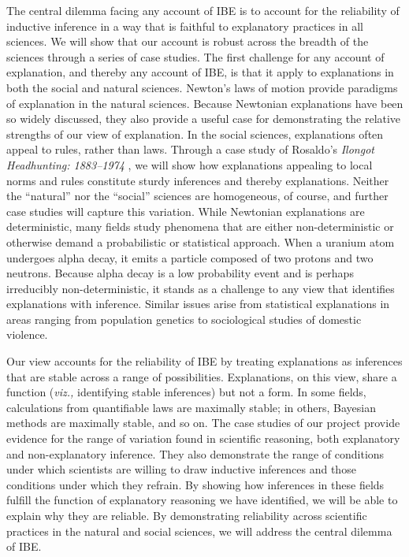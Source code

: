 \documentclass{article}[11pt]
\begin{document}
The central dilemma facing any account of IBE is to account for the reliability of inductive inference in a way that is faithful to explanatory practices in all sciences.  We will show that our account is robust across the breadth of the sciences through a series of case studies. The first challenge for any account of explanation, and thereby any account of IBE, is that it apply to explanations in both the social and natural sciences.  Newton's laws of motion provide paradigms of explanation in the natural sciences.  Because Newtonian explanations have been so widely discussed, they also provide a useful case for demonstrating the relative strengths of our view of explanation.  In the social sciences, explanations often appeal to rules, rather than laws. Through a case study of Rosaldo's \textit{Ilongot Headhunting: 1883--1974} \parencite*{Rosaldo1980}, we will show how explanations appealing to local norms and rules constitute sturdy inferences and thereby explanations.  Neither the ``natural'' nor the ``social'' sciences are homogeneous, of course, and further case studies will capture this variation.  While Newtonian explanations are deterministic, many fields study phenomena that are either non-deterministic or otherwise demand a probabilistic or statistical approach.  When a uranium atom undergoes alpha decay, it emits a particle composed of two protons and two neutrons.  Because alpha decay is a low probability event and is perhaps irreducibly non-deterministic, it stands as a challenge to any view that identifies explanations with inference.  Similar issues arise from statistical explanations in areas ranging from population genetics to sociological studies of domestic violence.  

Our view accounts for the reliability of IBE by treating explanations as inferences that are stable across a range of possibilities.  Explanations, on this view, share a function (\textit{viz.,} identifying stable inferences) but not a form.  In some fields, calculations from quantifiable laws are maximally stable; in others, Bayesian methods are maximally stable, and so on.  The case studies of our project provide evidence for the range of variation found in scientific reasoning, both explanatory and non-explanatory inference.  They also demonstrate the range of conditions under which scientists are willing to draw inductive inferences and those conditions under which they refrain.  By showing how inferences in these fields fulfill the function of explanatory reasoning we have identified, we will be able to explain why they are reliable.  By demonstrating reliability across scientific practices in the natural and social sciences, we will address the central dilemma of IBE.
\end{document}
